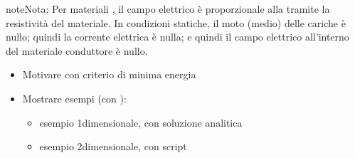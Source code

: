 \documentclass[letterpaper,10pt,italian]{jupyterBook}
\begin{document}
\begin{sphinxadmonition}{note}{Nota:}
\sphinxAtStartPar
Per materiali {\hyperref[\detokenize{ch/electromagnetism/electric-current:physics-hs-electromagnetism-electric-current-solids-conductor-ohm}]{}}, il campo elettrico è proporzionale alla {\hyperref[\detokenize{ch/electromagnetism/electric-current:electric-current-density-def}]{}} tramite la resistività del materiale. In condizioni statiche, il moto (medio) delle cariche è nullo; quindi la corrente elettrica è nulla; e quindi il campo elettrico all’interno del materiale conduttore è nullo.

\sphinxAtStartPar
{}
\begin{itemize}
\item {} 
\sphinxAtStartPar
Motivare con criterio di minima energia

\item {} 
\sphinxAtStartPar
Mostrare esempi (con ):
\begin{itemize}
\item {} 
\sphinxAtStartPar
esempio 1\sphinxhyphen{}dimensionale, con soluzione analitica

\item {} 
\sphinxAtStartPar
esempio 2\sphinxhyphen{}dimensionale, con script

\end{itemize}

\end{itemize}
\end{sphinxadmonition}
\label{ch/electromagnetism/electrostatics:example-2}
\end{document}
